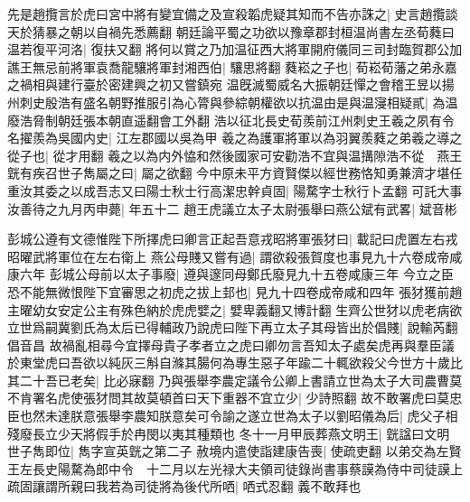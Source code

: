 先是趙攬言於虎曰宮中將有變宜備之及宣殺韜虎疑其知而不告亦誅之|{
	史言趙攬談天於猜暴之朝以自禍先悉薦翻}
朝廷論平蜀之功欲以豫章郡封桓温尚書左丞荀蕤曰温若復平河洛|{
	復扶又翻}
將何以賞之乃加温征西大將軍開府儀同三司封臨賀郡公加譙王無忌前將軍袁喬龍驤將軍封湘西伯|{
	驤思將翻}
蕤崧之子也|{
	荀崧荀藩之弟永嘉之禍相與建行臺於密建興之初又嘗鎮宛}
温旣滅蜀威名大振朝廷憚之會稽王昱以揚州刺史殷浩有盛名朝野推服引為心膂與參綜朝權欲以抗温由是與温寖相疑貳|{
	為温廢浩脅制朝廷張本朝直遥翻會工外翻}
浩以征北長史荀羨前江州刺史王羲之夙有令名擢羨為吳國内史|{
	江左郡國以吳為甲}
羲之為護軍將軍以為羽翼羨蕤之弟羲之導之從子也|{
	從才用翻}
羲之以為内外恊和然後國家可安勸浩不宜與温搆隙浩不從　燕王皝有疾召世子雋屬之曰|{
	屬之欲翻}
今中原未平方資賢傑以經世務恪知勇兼濟才堪任重汝其委之以成吾志又曰陽士秋士行高潔忠幹貞固|{
	陽騖字士秋行卜孟翻}
可託大事汝善待之九月丙申薨|{
	年五十二}
趙王虎議立太子太尉張舉曰燕公斌有武畧|{
	斌音彬}


彭城公遵有文德惟陛下所擇虎曰卿言正起吾意戎昭將軍張犲曰|{
	載記曰虎置左右戎昭曜武將軍位在左右衛上}
燕公母賤又嘗有過|{
	謂欲殺張賀度也事見九十六卷成帝咸康六年}
彭城公母前以太子事廢|{
	遵與邃同母鄭氏廢見九十五卷咸康三年}
今立之臣恐不能無微恨陛下宜審思之初虎之拔上邽也|{
	見九十四卷成帝咸和四年}
張犲獲前趙主曜幼女安定公主有殊色納於虎虎嬖之|{
	嬖卑義翻又博計翻}
生齊公世犲以虎老病欲立世爲嗣冀劉氏為太后已得輔政乃說虎曰陛下再立太子其母皆出於倡賤|{
	說輸芮翻倡音昌}
故禍亂相尋今宜擇母貴子孝者立之虎曰卿勿言吾知太子處矣虎再與羣臣議於東堂虎曰吾欲以純灰三斛自滌其腸何為專生惡子年踰二十輒欲殺父今世方十歲比其二十吾已老矣|{
	比必寐翻}
乃與張舉李農定議令公卿上書請立世為太子大司農曹莫不肯署名虎使張犲問其故莫頓首曰天下重器不宜立少|{
	少詩照翻}
故不敢署虎曰莫忠臣也然未達朕意張舉李農知朕意矣可令諭之遂立世為太子以劉昭儀為后|{
	虎父子相殘廢長立少天將假手於冉閔以夷其種類也}
冬十一月甲辰葬燕文明王|{
	皝諡曰文明}
世子雋即位|{
	雋字宣英皝之第二子}
赦境内遣使詣建康告喪|{
	使疏吏翻}
以弟交為左賢王左長史陽騖為郎中令　十二月以左光禄大夫領司徒錄尚書事蔡謨為侍中司徒謨上疏固讓謂所親曰我若為司徒將為後代所哂|{
	哂式忍翻}
義不敢拜也

